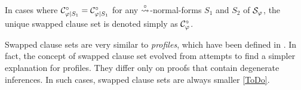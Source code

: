 \begin{remark}
In cases where $\mathcal{C}^{\circ}_{\varphi|S_1} = \mathcal{C}^{\circ}_{\varphi|S_1}$ for any $\stackrel{\circ}{\leadsto}$-normal-forms $S_1$ and $S_2$ of $\mathcal{S}_{\varphi}$, the unique swapped clause set is denoted simply as $\mathcal{C}^{\circ}_{\varphi}$.
\end{remark}


\begin{remark}
Swapped clause sets are very similar to \emph{profiles}, which have been defined in \cite{Hetzl2007CharacteristicClauseSetsandProofTransformations}. In fact, the concept of swapped clause set evolved from attempts to find a simpler explanation for profiles. They differ only on proofs that contain  degenerate inferences. In such cases, swapped clause sets are always smaller \ref{ToDo}.
\end{remark}




